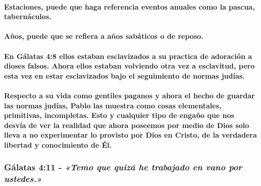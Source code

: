 \documentclass[11a pt,twoside]{article}
\newcommand{\scripture}[1]{%
  {\fontsize{12pt}{16pt}\selectfont\ScriptureFont\itshape #1}%
}
\let\oldsubsubsection\subsubsection
\renewcommand{\subsubsection}{\needspace{4\baselineskip}\oldsubsubsection}
\let\oldparagraph\paragraph
\renewcommand{\paragraph}{\needspace{3\baselineskip}\oldparagraph}
\begin{document}
\paragraph{Estaciones, puede que haga referencia eventos anuales como la
pascua,
tabernáculos.}\label{estaciones-puede-que-haga-referencia-eventos-anuales-como-la-pascua-tabernuxe1culos.}

\paragraph{Años, puede que se refiera a años sabáticos o de
reposo.}\label{auxf1os-puede-que-se-refiera-a-auxf1os-sabuxe1ticos-o-de-reposo.}

\paragraph{En Gálatas 4:8 ellos estaban esclavizados a su practica de
adoración a dioses falsos. Ahora ellos estaban volviendo otra vez a
esclavitud, pero esta vez en estar esclavizados bajo el seguimiento de
normas
judías.}\label{en-guxe1latas-48-ellos-estaban-esclavizados-a-su-practica-de-adoraciuxf3n-a-dioses-falsos.-ahora-ellos-estaban-volviendo-otra-vez-a-esclavitud-pero-esta-vez-en-estar-esclavizados-bajo-el-seguimiento-de-normas-juduxedas.}

\paragraph{Respecto a su vida como gentiles paganos y ahora el hecho de
guardar las normas judías, Pablo las muestra como cosas elementales,
primitivas, incompletas. Esto y cualquier tipo de engaño que nos desvía
de ver la realidad que ahora poseemos por medio de Dios solo lleva a no
experimentar lo provisto por Dios en Cristo, de la verdadera libertad y
conocimiento de
Él.}\label{respecto-a-su-vida-como-gentiles-paganos-y-ahora-el-hecho-de-guardar-las-normas-juduxedas-pablo-las-muestra-como-cosas-elementales-primitivas-incompletas.-esto-y-cualquier-tipo-de-engauxf1o-que-nos-desvuxeda-de-ver-la-realidad-que-ahora-poseemos-por-medio-de-dios-solo-lleva-a-no-experimentar-lo-provisto-por-dios-en-cristo-de-la-verdadera-libertad-y-conocimiento-de-uxe9l.}

\subsubsection{\texorpdfstring{Gálatas 4:11 -
\scripture{«Temo que quizá he trabajado en vano por ustedes.»}}{Gálatas 4:11 - }}\label{guxe1latas-411---temo-que-quizuxe1-he-trabajado-en-vano-por-ustedes.}
\end{document}
